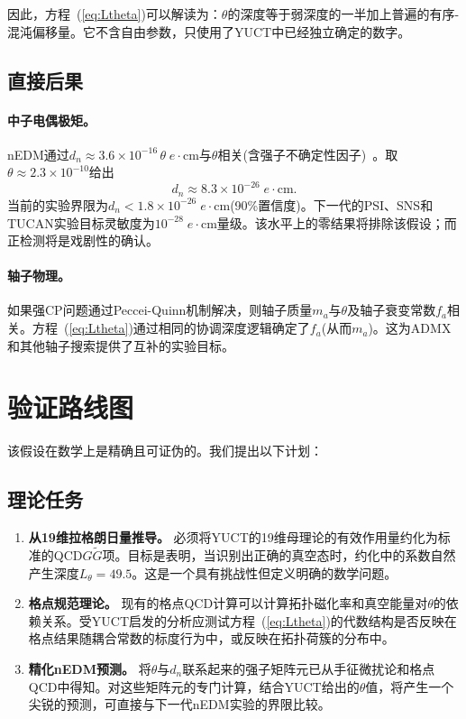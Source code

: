 \documentclass[12pt,a4paper]{article}
\begin{document}
	因此，方程~(\ref{eq:Ltheta})可以解读为：\(\theta\)的深度等于弱深度的一半加上普遍的有序-混沌偏移量。它不含自由参数，只使用了YUCT中已经独立确定的数字。
	
	\subsection{直接后果}
	
	\paragraph{中子电偶极矩。}
	nEDM通过\(d_n \approx 3.6 \times 10^{-16}\,\theta\; e\!\cdot\!\mathrm{cm}\)与\(\theta\)相关(含强子不确定性因子)~\cite{nEDM2020}。取\(\theta \approx 2.3 \times 10^{-10}\)给出
	\[
	d_n \approx 8.3 \times 10^{-26}\; e\!\cdot\!\mathrm{cm}.
	\]
	当前的实验界限为\(d_n < 1.8 \times 10^{-26}\; e\!\cdot\!\mathrm{cm}\)(90\%置信度)。下一代的PSI、SNS和TUCAN实验目标灵敏度为\(10^{-28}\; e\!\cdot\!\mathrm{cm}\)量级。该水平上的零结果将排除该假设；而正检测将是戏剧性的确认。
	
	\paragraph{轴子物理。}
	如果强CP问题通过Peccei-Quinn机制解决，则轴子质量\(m_a\)与\(\theta\)及轴子衰变常数\(f_a\)相关。方程~(\ref{eq:Ltheta})通过相同的协调深度逻辑确定了\(f_a\)(从而\(m_a\))。这为ADMX和其他轴子搜索提供了互补的实验目标。
	
	\section{验证路线图}
	\label{sec:roadmap}
	
	该假设在数学上是精确且可证伪的。我们提出以下计划：
	
	\subsection{理论任务}
	\begin{enumerate}
		\item \textbf{从19维拉格朗日量推导。}
		必须将YUCT的19维母理论的有效作用量约化为标准的QCD\(G\widetilde{G}\)项。目标是表明，当识别出正确的真空态时，约化中的系数自然产生深度\(L_\theta = 49.5\)。这是一个具有挑战性但定义明确的数学问题。
		\item \textbf{格点规范理论。}
		现有的格点QCD计算可以计算拓扑磁化率和真空能量对\(\theta\)的依赖关系。受YUCT启发的分析应测试方程~(\ref{eq:Ltheta})的代数结构是否反映在格点结果随耦合常数的标度行为中，或反映在拓扑荷簇的分布中。
		\item \textbf{精化nEDM预测。}
		将\(\theta\)与\(d_n\)联系起来的强子矩阵元已从手征微扰论和格点QCD中得知。对这些矩阵元的专门计算，结合YUCT给出的\(\theta\)值，将产生一个尖锐的预测，可直接与下一代nEDM实验的界限比较。
	\end{enumerate}
	
\end{document}

